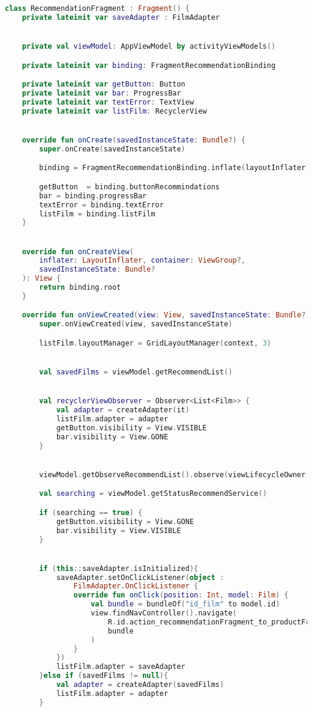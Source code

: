 \begin{lstlisting}[language=Kotlin, caption=\leftline{RecommendationFragment}, label=lst:RecommendationFragment]
class RecommendationFragment : Fragment() {
    private lateinit var saveAdapter : FilmAdapter


    private val viewModel: AppViewModel by activityViewModels()

    private lateinit var binding: FragmentRecommendationBinding

    private lateinit var getButton: Button
    private lateinit var bar: ProgressBar
    private lateinit var textError: TextView
    private lateinit var listFilm: RecyclerView


    override fun onCreate(savedInstanceState: Bundle?) {
        super.onCreate(savedInstanceState)

        binding = FragmentRecommendationBinding.inflate(layoutInflater)

        getButton  = binding.buttonRecommindations
        bar = binding.progressBar
        textError = binding.textError
        listFilm = binding.listFilm
    }


    override fun onCreateView(
        inflater: LayoutInflater, container: ViewGroup?,
        savedInstanceState: Bundle?
    ): View {
        return binding.root
    }

    override fun onViewCreated(view: View, savedInstanceState: Bundle?) {
        super.onViewCreated(view, savedInstanceState)

        listFilm.layoutManager = GridLayoutManager(context, 3)


        val savedFilms = viewModel.getRecommendList()


        val recyclerViewObserver = Observer<List<Film>> {
            val adapter = createAdapter(it)
            listFilm.adapter = adapter
            getButton.visibility = View.VISIBLE
            bar.visibility = View.GONE
        }


        viewModel.getObserveRecommendList().observe(viewLifecycleOwner, recyclerViewObserver)

        val searching = viewModel.getStatusRecommendService()

        if (searching == true) {
            getButton.visibility = View.GONE
            bar.visibility = View.VISIBLE
        }


        if (this::saveAdapter.isInitialized){
            saveAdapter.setOnClickListener(object :
                FilmAdapter.OnClickListener {
                override fun onClick(position: Int, model: Film) {
                    val bundle = bundleOf("id_film" to model.id)
                    view.findNavController().navigate(
                        R.id.action_recommendationFragment_to_productFragment,
                        bundle
                    )
                }
            })
            listFilm.adapter = saveAdapter
        }else if (savedFilms != null){
            val adapter = createAdapter(savedFilms)
            listFilm.adapter = adapter
        }



\end{lstlisting}
